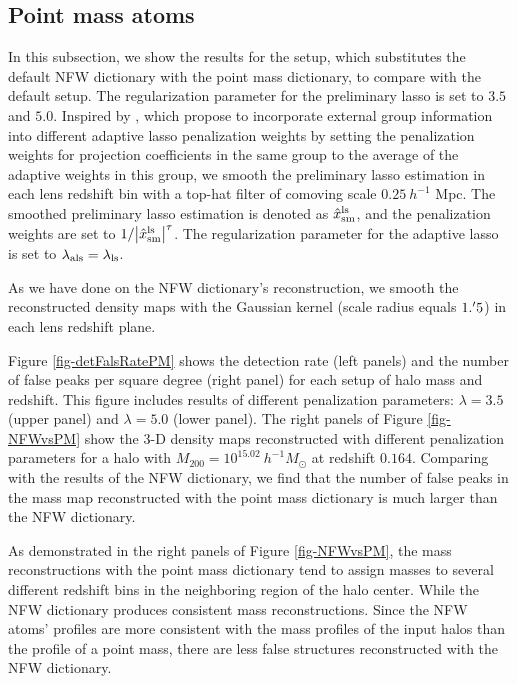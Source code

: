 \documentclass[twocolumn]{aastex62}
\begin{document}
\subsection{Point mass atoms}
\label{subsec:test-pm}

In this subsection, we show the results for the setup, which substitutes the
default NFW dictionary with the point mass dictionary, to compare with the
default setup.  The regularization parameter for the preliminary lasso is set
to $3.5$ and $5.0$.  Inspired by \citet{structureAdaLasso-Pramanik2020}, which
propose to incorporate external group information into different adaptive lasso
penalization weights by setting the penalization weights for projection
coefficients in the same group to the average of the adaptive weights in this
group, we smooth the preliminary lasso estimation in each lens redshift bin
with a top-hat filter of comoving scale $0.25~h^{-1}$ Mpc. The smoothed
preliminary lasso estimation is denoted as $\hat{x}^{\rm{ls}}_{\rm{sm}}$, and
the penalization weights are set to $1/\abs{\hat{x}^{\rm{ls}}_{\rm{sm}}}^\tau$.
The regularization parameter for the adaptive lasso is set to
$\lambda_{\rm{als}}=\lambda_{\rm{ls}}$.

As we have done on the NFW dictionary's reconstruction, we smooth the
reconstructed density maps with the Gaussian kernel (scale radius equals
$1.\mbox{$^\prime$} 5$) in each lens redshift plane.

Figure \ref{fig-detFalsRatePM} shows the detection rate (left panels) and the
number of false peaks per square degree (right panel) for each setup of halo
mass and redshift.
This figure includes results of different penalization parameters:
$\lambda=3.5$ (upper panel) and $\lambda=5.0$ (lower panel). The right panels
of Figure \ref{fig-NFWvsPM} show the $3$-D density maps reconstructed with
different penalization parameters for a halo with $M_{200}=10^{15.02}
~h^{-1}M_{\odot}$ at redshift $0.164$.
Comparing with the results of the NFW dictionary, we find that the number of
false peaks in the mass map reconstructed with the point mass dictionary is
much larger than the NFW dictionary.

As demonstrated in the right panels of Figure \ref{fig-NFWvsPM}, the mass
reconstructions with the point mass dictionary tend to assign masses to
several different redshift bins in the neighboring region of the halo center.
While the NFW dictionary produces consistent mass reconstructions.
Since the NFW atoms' profiles are more consistent with the mass profiles of the
input halos than the profile of a point mass, there are less false structures
reconstructed with the NFW dictionary.
\end{document}
